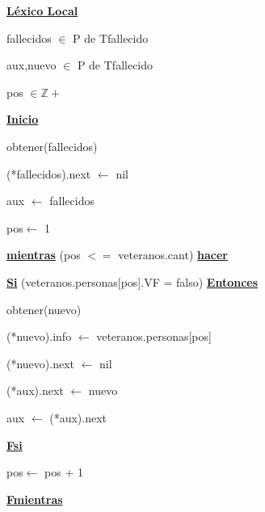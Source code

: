 \documentclass{article}
\begin{document}
        \hspace{8mm}\underline{\textbf{Léxico Local}}

            \hspace{12mm}fallecidos $\in$ P de Tfallecido

            \hspace{12mm}aux,nuevo $\in$ P de Tfallecido

            \hspace{12mm}pos $\in \mathbb{Z}+$

        \hspace{8mm}\underline{\textbf{Inicio}}

            \hspace{12mm}obtener(fallecidos)

            \hspace{12mm}(*fallecidos).next $\leftarrow$ nil

            \hspace{12mm}aux $\leftarrow$ fallecidos

            \hspace{12mm}pos$\leftarrow$ 1

            \hspace{12mm}\underline{\textbf{mientras}} (pos $<=$ veteranos.cant) \underline{\textbf{hacer}}

                \hspace{16mm}\underline{\textbf{Si}} (veteranos.personas[pos].VF = falso) \underline{\textbf{Entonces}}

                    \hspace{20mm}obtener(nuevo)

                    \hspace{20mm}(*nuevo).info $\leftarrow$ veteranos.personas[pos]

                    \hspace{20mm}(*nuevo).next $\leftarrow$ nil

                    \hspace{20mm}(*aux).next $\leftarrow$ nuevo

                    \hspace{20mm}aux $\leftarrow$ (*aux).next

                \hspace{16mm}\underline{\textbf{Fsi}}

                \hspace{16mm}pos$\leftarrow$ pos + 1

            \hspace{12mm}\underline{\textbf{Fmientras}}
\end{document}
